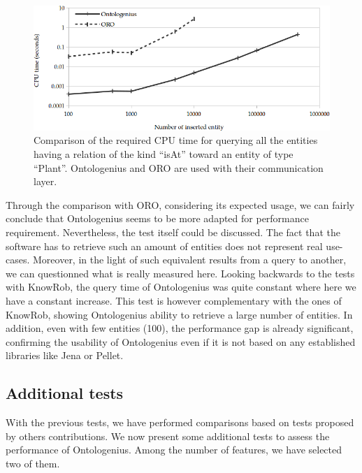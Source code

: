 \begin{figure}[ht!]
\centering
\includegraphics[width=\textwidth]{figures/chapter2/oro/R2.png}
\caption{\label{fig:chap2_oro_r2} Comparison of the required CPU time for querying all the entities having a relation of the kind ``isAt'' toward an entity of type ``Plant''. Ontologenius and ORO are used with their communication layer.}
\end{figure}

Through the comparison with ORO, considering its expected usage, we can fairly conclude that Ontologenius seems to be more adapted for performance requirement. Nevertheless, the test itself could be discussed. The fact that the software has to retrieve such an amount of entities does not represent real use-cases. Moreover, in the light of such equivalent results from a query to another, we can questionned what is really measured here. Looking backwards to the tests with KnowRob, the query time of Ontologenius was quite constant where here we have a constant increase. This test is however complementary with the ones of KnowRob, showing Ontologenius ability to retrieve a large number of entities. In addition, even with few entities (100), the performance gap is already significant, confirming the usability of Ontologenius even if it is not based on any established libraries like Jena or Pellet. 

\subsection{Additional tests}

With the previous tests, we have performed comparisons based on tests proposed by others contributions. We now present some additional tests to assess the performance of Ontologenius. Among the number of features, we have selected two of them.

